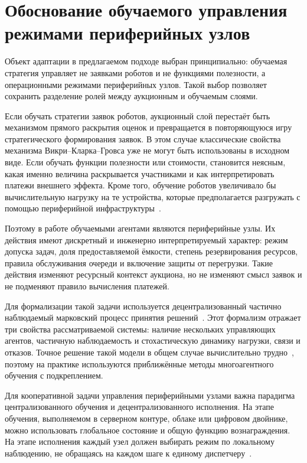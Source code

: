 \section{Обоснование обучаемого управления режимами периферийных узлов}

Объект адаптации в предлагаемом подходе выбран принципиально: обучаемая стратегия управляет не заявками роботов и не функциями полезности, а операционными режимами периферийных узлов. Такой выбор позволяет сохранить разделение ролей между аукционным и обучаемым слоями.

Если обучать стратегии заявок роботов, аукционный слой перестаёт быть механизмом прямого раскрытия оценок и превращается в повторяющуюся игру стратегического формирования заявок. В этом случае классические свойства механизма Викри--Кларка--Гровса уже не могут быть использованы в исходном виде. Если обучать функции полезности или стоимости, становится неясным, какая именно величина раскрывается участниками и как интерпретировать платежи внешнего эффекта. Кроме того, обучение роботов увеличивало бы вычислительную нагрузку на те устройства, которые предполагается разгружать с помощью периферийной инфраструктуры~\cite{Ning2024MARLSurvey,
	Hady2025MARLRAOSurvey,Oroojlooy2023CoopReview,Ismail2025DRLMECSurvey,Jiang2024TaskOrientedMARL,Li2024SatelliteMARL,Chen2025ServiceMigration,Djigal2022MLMECSurvey,Hazra2024DRLEdgeChallenges,Hortelano2023RLOffloadingSurvey,Peng2024DRLOffloadingSurvey}.

Поэтому в работе обучаемыми агентами являются периферийные узлы. Их действия имеют дискретный и инженерно интерпретируемый характер: режим допуска задач, доля предоставляемой ёмкости, степень резервирования ресурсов, правила обслуживания очереди и включение защиты от перегрузки. Такие действия изменяют ресурсный контекст аукциона, но не изменяют смысл заявок и не подменяют правило вычисления платежей.

Для формализации такой задачи используется децентрализованный частично наблюдаемый марковский процесс принятия решений~\cite{Oliehoek2016DecPOMDP,Amato2013DecentralizedControl}. Этот формализм отражает три свойства рассматриваемой системы: наличие нескольких управляющих агентов, частичную наблюдаемость и стохастическую динамику нагрузки, связи и отказов. Точное решение такой модели в общем случае вычислительно трудно~\cite{Bernstein2002Complexity}, поэтому на практике используются приближённые методы многоагентного обучения с подкреплением.

Для кооперативной задачи управления периферийными узлами важна парадигма централизованного обучения и децентрализованного исполнения. На этапе обучения, выполняемом в серверном контуре, облаке или цифровом двойнике, можно использовать глобальное состояние и общую функцию вознаграждения. На этапе исполнения каждый узел должен выбирать режим по локальному наблюдению, не обращаясь на каждом шаге к единому диспетчеру~\cite{Amato2024CTDE}.

